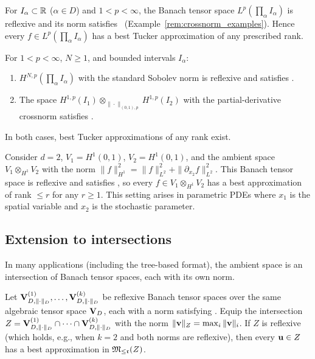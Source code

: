 \begin{corollary}
\label{cor:best_approx_lp}
For $I_\alpha \subset \mathbb{R}$ ($\alpha \in D$) and $1 < p < \infty$,
the Banach tensor space $L^p(\prod_\alpha I_\alpha)$ is reflexive and
its norm satisfies \condINJ\ (Example~\ref{rem:crossnorm_examples}).
Hence every $f \in L^p(\prod_\alpha I_\alpha)$ has a best
Tucker approximation of any prescribed rank.
\end{corollary}

\begin{corollary}
\label{cor:best_approx_sobolev}
For $1 < p < \infty$, $N \geq 1$, and bounded intervals $I_\alpha$:
\begin{enumerate}
\item[\textup{(i)}] $H^{N,p}(\prod_\alpha I_\alpha)$ with the standard
    Sobolev norm is reflexive and satisfies \condINJ.
\item[\textup{(ii)}] The space $H^{1,p}(I_1) \otimes_{\|\cdot\|_{(0,1),p}}
    H^{1,p}(I_2)$ with the partial-derivative crossnorm satisfies \condINJ.
\end{enumerate}
In both cases, best Tucker approximations of any rank exist.
\end{corollary}

\begin{example}
\label{ex:min:sobolev}
Consider $d=2$, $V_1 = H^1(0,1)$, $V_2 = H^1(0,1)$, and the
ambient space $V_1 \otimes_{H^1} V_2$ with the norm
$\|f\|_{H^1}^2 = \|f\|_{L^2}^2 + \|\partial_{x_2} f\|_{L^2}^2$.
This Banach tensor space is reflexive and satisfies \condINJ, so every
$f \in V_1 \otimes_{H^1} V_2$ has a best approximation of
rank $\leq r$ for any $r \geq 1$. This setting arises in parametric PDEs
where $x_1$ is the spatial variable and $x_2$ is the stochastic parameter.
\end{example}

\subsection*{Extension to intersections}

In many applications (including the tree-based format), the ambient
space is an intersection of Banach tensor spaces, each with its own norm.

\begin{theorem}
\label{thm:best_approx_intersection}
Let $\mathbf{V}_{D,\|\cdot\|_D}^{(1)}, \ldots, \mathbf{V}_{D,\|\cdot\|_D}^{(k)}$ be reflexive Banach tensor
spaces over the same algebraic tensor space $\mathbf{V}_D$, each with a norm
satisfying \condINJ. Equip the intersection
$Z = \mathbf{V}_{D,\|\cdot\|_D}^{(1)} \cap \cdots \cap \mathbf{V}_{D,\|\cdot\|_D}^{(k)}$ with the norm
$\|\mathbf{v}\|_Z = \max_{i} \|\mathbf{v}\|_i$. If $Z$ is reflexive (which holds,
e.g., when $k=2$ and both norms are reflexive), then every $\mathbf{u} \in Z$
has a best approximation in $\mathfrak{M}_{\leq\mathfrak{r}}(Z)$.
\end{theorem}

